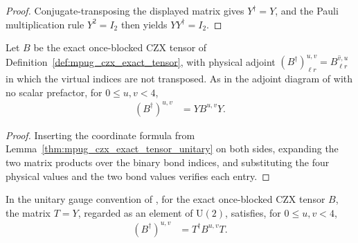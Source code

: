 \begin{proof}\leanok
    Conjugate-transposing the displayed matrix gives $Y^\dagger=Y$, and
    the Pauli multiplication rule $Y^2=I_2$ then yields $YY^\dagger=I_2$.
\end{proof}

\begin{lemma}
    \label{thm:mpug_czx_physical_adjoint}
    \leanok
    Let $B$ be the exact once-blocked CZX tensor of
    Definition~\ref{def:mpug_czx_exact_tensor}, with physical adjoint
    $(B^\dagger)^{u,v}_{\ell r}=\overline{B^{v,u}_{\ell r}}$ in which the
    virtual indices are not transposed. As in the adjoint diagram of
    \cite[lines~4547--4559]{FrancoRubio2025MPUGauging} with no scalar
    prefactor, for $0\leq u,v<4$,
    \begin{align}
        (B^\dagger)^{u,v} & =YB^{u,v}Y.
    \end{align}
\end{lemma}

\begin{proof}\leanok
    Inserting the coordinate formula from
    Lemma~\ref{thm:mpug_czx_exact_tensor_unitary} on both sides, expanding
    the two matrix products over the binary bond indices, and substituting
    the four physical values and the two bond values verifies each entry.
\end{proof}

\begin{lemma}
    \label{thm:mpug_czx_unitary_dagger_gauge}
    \leanok
    In the unitary gauge convention of
    \cite[lines~1552--1557 and 4547--4559]{FrancoRubio2025MPUGauging}, for
    the exact once-blocked CZX tensor $B$, the matrix $T=Y$, regarded as an
    element of $\mathrm{U}(2)$, satisfies, for $0\leq u,v<4$,
    \begin{align}
        (B^\dagger)^{u,v} & =T^\dagger B^{u,v}T.
    \end{align}
\end{lemma}

